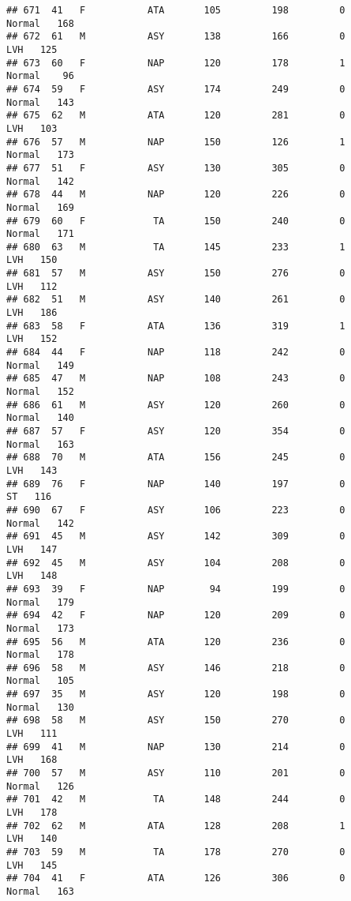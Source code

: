 \documentclass[
]{article}
\begin{document}
\begin{verbatim}
## 671  41   F           ATA       105         198         0     Normal   168
## 672  61   M           ASY       138         166         0        LVH   125
## 673  60   F           NAP       120         178         1     Normal    96
## 674  59   F           ASY       174         249         0     Normal   143
## 675  62   M           ATA       120         281         0        LVH   103
## 676  57   M           NAP       150         126         1     Normal   173
## 677  51   F           ASY       130         305         0     Normal   142
## 678  44   M           NAP       120         226         0     Normal   169
## 679  60   F            TA       150         240         0     Normal   171
## 680  63   M            TA       145         233         1        LVH   150
## 681  57   M           ASY       150         276         0        LVH   112
## 682  51   M           ASY       140         261         0        LVH   186
## 683  58   F           ATA       136         319         1        LVH   152
## 684  44   F           NAP       118         242         0     Normal   149
## 685  47   M           NAP       108         243         0     Normal   152
## 686  61   M           ASY       120         260         0     Normal   140
## 687  57   F           ASY       120         354         0     Normal   163
## 688  70   M           ATA       156         245         0        LVH   143
## 689  76   F           NAP       140         197         0         ST   116
## 690  67   F           ASY       106         223         0     Normal   142
## 691  45   M           ASY       142         309         0        LVH   147
## 692  45   M           ASY       104         208         0        LVH   148
## 693  39   F           NAP        94         199         0     Normal   179
## 694  42   F           NAP       120         209         0     Normal   173
## 695  56   M           ATA       120         236         0     Normal   178
## 696  58   M           ASY       146         218         0     Normal   105
## 697  35   M           ASY       120         198         0     Normal   130
## 698  58   M           ASY       150         270         0        LVH   111
## 699  41   M           NAP       130         214         0        LVH   168
## 700  57   M           ASY       110         201         0     Normal   126
## 701  42   M            TA       148         244         0        LVH   178
## 702  62   M           ATA       128         208         1        LVH   140
## 703  59   M            TA       178         270         0        LVH   145
## 704  41   F           ATA       126         306         0     Normal   163

\end{verbatim}
\end{document}
